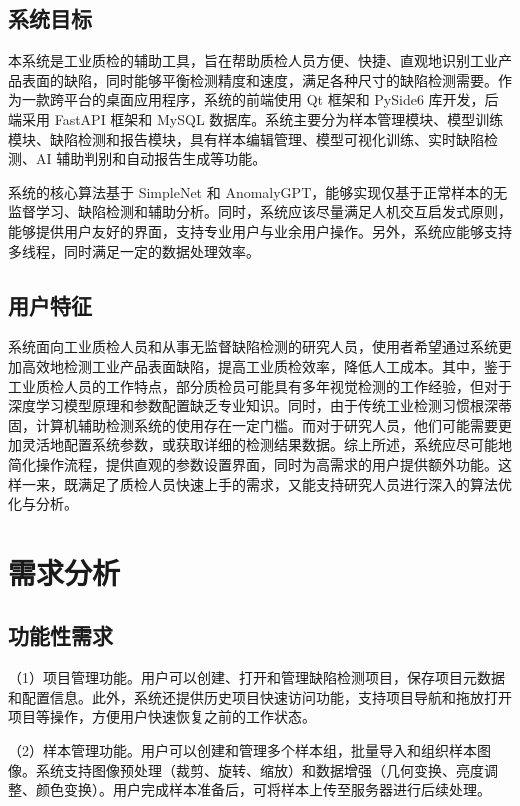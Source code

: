 \documentclass[
  ]{njuthesis}
\begin{document}
\subsection{系统目标}

本系统是工业质检的辅助工具，旨在帮助质检人员方便、快捷、直观地识别工业产品表面的缺陷，同时能够平衡检测精度和速度，满足各种尺寸的缺陷检测需要。作为一款跨平台的桌面应用程序，系统的前端使用 Qt 框架和 PySide6 库开发，后端采用 FastAPI 框架和 MySQL 数据库。系统主要分为样本管理模块、模型训练模块、缺陷检测和报告模块，具有样本编辑管理、模型可视化训练、实时缺陷检测、AI 辅助判别和自动报告生成等功能。

系统的核心算法基于 SimpleNet 和 AnomalyGPT，能够实现仅基于正常样本的无监督学习、缺陷检测和辅助分析。同时，系统应该尽量满足人机交互启发式原则，能够提供用户友好的界面，支持专业用户与业余用户操作。另外，系统应能够支持多线程，同时满足一定的数据处理效率。

\subsection{用户特征}

系统面向工业质检人员和从事无监督缺陷检测的研究人员，使用者希望通过系统更加高效地检测工业产品表面缺陷，提高工业质检效率，降低人工成本。其中，鉴于工业质检人员的工作特点，部分质检员可能具有多年视觉检测的工作经验，但对于深度学习模型原理和参数配置缺乏专业知识。同时，由于传统工业检测习惯根深蒂固，计算机辅助检测系统的使用存在一定门槛。而对于研究人员，他们可能需要更加灵活地配置系统参数，或获取详细的检测结果数据。综上所述，系统应尽可能地简化操作流程，提供直观的参数设置界面，同时为高需求的用户提供额外功能。这样一来，既满足了质检人员快速上手的需求，又能支持研究人员进行深入的算法优化与分析。

\section{需求分析}

\subsection{功能性需求}

（1）项目管理功能。用户可以创建、打开和管理缺陷检测项目，保存项目元数据和配置信息。此外，系统还提供历史项目快速访问功能，支持项目导航和拖放打开项目等操作，方便用户快速恢复之前的工作状态。

（2）样本管理功能。用户可以创建和管理多个样本组，批量导入和组织样本图像。系统支持图像预处理（裁剪、旋转、缩放）和数据增强（几何变换、亮度调整、颜色变换）。用户完成样本准备后，可将样本上传至服务器进行后续处理。
\end{document}
